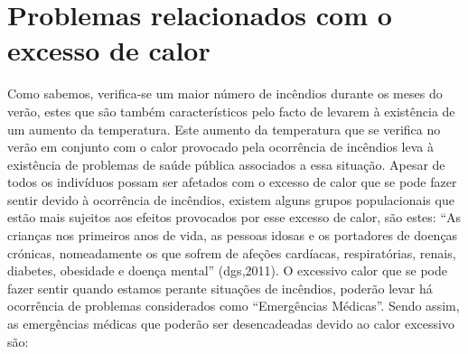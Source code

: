 \documentclass{report}
\begin{document}
\section{Problemas relacionados com o excesso de calor}
\label{problemas relacionados com o excesso de calor}
\cite{dgsriscos}

Como sabemos, verifica-se um maior número de incêndios durante os meses do verão, estes que são também característicos pelo facto de levarem à existência de um aumento da temperatura. Este aumento da temperatura que se verifica no verão em conjunto com o calor provocado pela ocorrência de incêndios leva à existência de problemas de saúde pública associados a essa situação.
Apesar de todos os indivíduos possam ser afetados com o excesso de calor que se pode fazer sentir devido à ocorrência de incêndios, existem alguns grupos populacionais que estão mais sujeitos aos efeitos provocados por esse excesso de calor, são estes: “As crianças nos primeiros anos de vida, as pessoas idosas e os portadores de doenças crónicas, nomeadamente os que sofrem de afeções cardíacas, respiratórias, renais, diabetes, obesidade e doença mental” (\ac{dgs},2011).
O excessivo calor que se pode fazer sentir quando estamos perante situações de incêndios, poderão levar há ocorrência de problemas considerados como “Emergências Médicas”. Sendo assim, as emergências médicas que poderão ser desencadeadas devido ao calor excessivo são:
\end{document}
